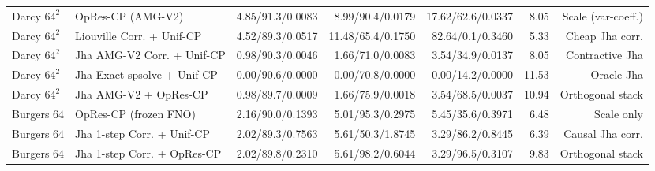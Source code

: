\begin{table}[t]
{\begin{tabular}{llrrrrr}
Darcy $64^2$ & OpRes-CP (AMG-V2) & 4.85/91.3/0.0083 & 8.99/90.4/0.0179 & 17.62/62.6/0.0337 & 8.05 & Scale (var-coeff.) \\
Darcy $64^2$ & Liouville Corr. + Unif-CP & 4.52/89.3/0.0517 & 11.48/65.4/0.1750 & 82.64/0.1/0.3460 & 5.33 & Cheap Jha corr. \\
Darcy $64^2$ & Jha AMG-V2 Corr. + Unif-CP & 0.98/90.3/0.0046 & 1.66/71.0/0.0083 & 3.54/34.9/0.0137 & 8.05 & Contractive Jha \\
Darcy $64^2$ & Jha Exact spsolve + Unif-CP & 0.00/90.6/0.0000 & 0.00/70.8/0.0000 & 0.00/14.2/0.0000 & 11.53 & Oracle Jha \\
Darcy $64^2$ & Jha AMG-V2 + OpRes-CP & 0.98/89.7/0.0009 & 1.66/75.9/0.0018 & 3.54/68.5/0.0037 & 10.94 & Orthogonal stack \\
\addlinespace[2pt]
Burgers $64$ & OpRes-CP (frozen FNO) & 2.16/90.0/0.1393 & 5.01/95.3/0.2975 & 5.45/35.6/0.3971 & 6.48 & Scale only \\
Burgers $64$ & Jha 1-step Corr. + Unif-CP & 2.02/89.3/0.7563 & 5.61/50.3/1.8745 & 3.29/86.2/0.8445 & 6.39 & Causal Jha corr. \\
Burgers $64$ & Jha 1-step Corr. + OpRes-CP & 2.02/89.8/0.2310 & 5.61/98.2/0.6044 & 3.29/96.5/0.3107 & 9.83 & Orthogonal stack \\
\bottomrule
\end{tabular}%
}
\end{table}
